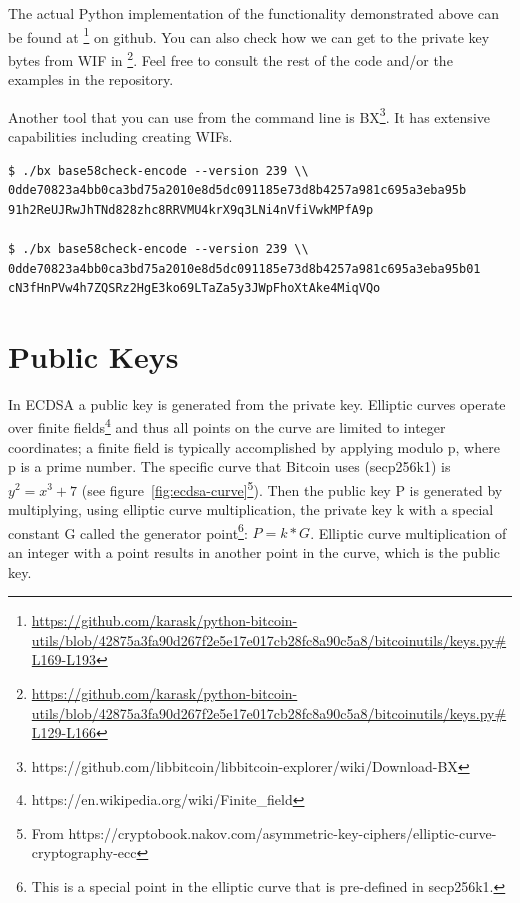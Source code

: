 The actual Python implementation of the functionality demonstrated above can be found at \footnote{\url{https://github.com/karask/python-bitcoin-utils/blob/42875a3fa90d267f2e5e17e017cb28fc8a90c5a8/bitcoinutils/keys.py\#L169-L193}} on github. You can also check how we can get to the private key bytes from WIF in \footnote{\url{https://github.com/karask/python-bitcoin-utils/blob/42875a3fa90d267f2e5e17e017cb28fc8a90c5a8/bitcoinutils/keys.py\#L129-L166}}. Feel free to consult the rest of the code and/or the examples in the repository.

Another tool that you can use from the command line is BX\footnote{https://github.com/libbitcoin/libbitcoin-explorer/wiki/Download-BX}. It has extensive capabilities including creating WIFs.

\begin{emphbox}
\begin{lstlisting}[style=Bash]
$ ./bx base58check-encode --version 239 \\
0dde70823a4bb0ca3bd75a2010e8d5dc091185e73d8b4257a981c695a3eba95b
91h2ReUJRwJhTNd828zhc8RRVMU4krX9q3LNi4nVfiVwkMPfA9p

$ ./bx base58check-encode --version 239 \\
0dde70823a4bb0ca3bd75a2010e8d5dc091185e73d8b4257a981c695a3eba95b01
cN3fHnPVw4h7ZQSRz2HgE3ko69LTaZa5y3JWpFhoXtAke4MiqVQo
\end{lstlisting}
\end{emphbox}


\section{Public Keys}
In ECDSA a public key is generated from the private key. Elliptic curves operate over finite fields\footnote{https://en.wikipedia.org/wiki/Finite\_field} and thus all points on the curve are limited to integer coordinates; a finite field is typically accomplished by applying modulo p, where p is a prime number. The specific curve that Bitcoin uses (secp256k1) is  $y^2 = x^3 + 7$ (see figure~\ref{fig:ecdsa-curve}\footnote{From https://cryptobook.nakov.com/asymmetric-key-ciphers/elliptic-curve-cryptography-ecc}). Then the public key P is generated by multiplying, using elliptic curve multiplication, the private key k with a special constant G called the generator point\footnote{This is a special point in the elliptic curve that is pre-defined in secp256k1.}: $P = k * G$. Elliptic curve multiplication of an integer with a point results in another point in the curve, which is the public key.

